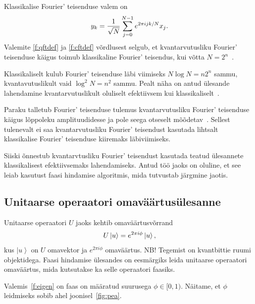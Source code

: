 \documentclass[12pt]{report}
\def\ket#1{\left|#1\right>}
\begin{document}
Klassikalise Fourier' teisenduse valem on
\begin{align}\label{f:cftdef}
    y_k = \frac{1}{\sqrt{N}} \sum_{j=0}^{N-1}e^{2\pi ijk/N} x_j \rlap{.}
\end{align}
Valemite \ref{f:qftdef} ja \ref{f:cftdef} võrdlusest selgub, et kvantarvutusliku Fourier' teisenduse käigus toimub klassikaline Fourier' teisendus, kui võtta \(N = 2^n\)~\cite{nielsen+chuang}.

Klassikaliselt kulub Fourier' teisenduse läbi viimiseks \(N \log{N}=n 2^n \) sammu, kvantavutuslikult vaid \(\log^2{N} = n^2\) sammu.
Pealt näha on antud ülesande lahendamine kvantarvutuslikult oluliselt efektiivsem kui klassikaliselt~\cite{nielsen+chuang}.

Paraku talletub Fourier' teisenduse tulemus kvantarvutusliku Fourier' teisenduse käigus lõppoleku amplituudidesse ja pole seega otseselt mõõdetav~\cite{nielsen+chuang}.
Sellest tulenevalt ei saa kvantarvutusliku Fourier' teisendust kasutada lihtsalt klassikalise Fourier' teisenduse kiiremaks läbiviimiseks.


Siiski õnnestub kvantarvtusliku Fourier' teisendust kasutada teatud ülesannete klassikalisest efektiivsemaks lahendamiseks.
Antud töö jaoks on oluline, et see leiab kasutust faasi hindamise algoritmis, mida tutvustab järgmine jaotis.


\subsection{Unitaarse operaatori omaväärtusülesanne}\label{sec:unitary}

Unitaarse operaatori \(U\) jaoks kehtib omaväärtusvõrrand
\begin{align}\label{f:eigen}
    U \ket{u} = e^{2\pi i\phi} \ket{u}\rlap{,}
\end{align}
kus \(\ket{u}\) on \(U\) omavektor ja \(e^{2\pi i\phi}\) omaväärtus.
NB! Tegemist on kvantbittie ruumi objektidega.
Faasi hindamise ülesandes on eesmärgiks leida unitaarse operaatori omaväärtus, mida kutsutakse ka selle operaatori faasiks.

Valemis~\ref{f:eigen} on faas on määratud suurusega \(\phi \in [0, 1)\).
Näitame, et \(\phi\) leidmiseks sobib ahel joonisel~\ref{fig:pea}.
\end{document}
